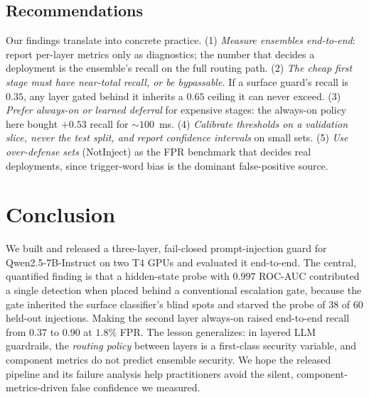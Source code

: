 \documentclass[conference]{IEEEtran}
\begin{document}
\subsection{Recommendations}
\label{sec:recs}
Our findings translate into concrete practice. (1) \emph{Measure ensembles
end-to-end}: report per-layer metrics only as diagnostics; the number that
decides a deployment is the ensemble's recall on the full routing path.
(2) \emph{The cheap first stage must have near-total recall, or be bypassable.}
If a surface guard's recall is $0.35$, any layer gated behind it inherits a
$0.65$ ceiling it can never exceed. (3) \emph{Prefer always-on or learned
deferral} for expensive stages: the always-on policy here bought $+0.53$ recall
for ${\sim}100$~ms. (4) \emph{Calibrate thresholds on a validation slice, never
the test split, and report confidence intervals} on small sets. (5) \emph{Use
over-defense sets} (NotInject) as the FPR benchmark that decides real
deployments, since trigger-word bias is the dominant false-positive source.

\section{Conclusion}
\label{sec:conclusion}
We built and released a three-layer, fail-closed prompt-injection guard for
Qwen2.5-7B-Instruct on two T4 GPUs and evaluated it end-to-end. The central,
quantified finding is that a hidden-state probe with $0.997$ ROC-AUC contributed
a single detection when placed behind a conventional escalation gate, because
the gate inherited the surface classifier's blind spots and starved the probe
of $38$ of $60$ held-out injections. Making the second layer always-on raised
end-to-end recall from $0.37$ to $0.90$ at $1.8\%$ FPR. The lesson generalizes:
in layered LLM guardrails, the \emph{routing policy} between layers is a
first-class security variable, and component metrics do not predict ensemble
security. We hope the released pipeline and its failure analysis help
practitioners avoid the silent, component-metrics-driven false confidence we
measured.
\end{document}
